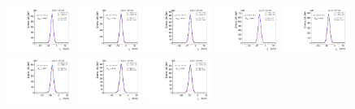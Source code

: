 \begin{figure}[htb]
\includegraphics[width=0.19\textwidth]{plots/Appendix_Recoil_Fits/WmpMC_PF_5TeV_2G/pfu1fit_16.pdf}
\includegraphics[width=0.19\textwidth]{plots/Appendix_Recoil_Fits/WmpMC_PF_5TeV_2G/pfu1fit_17.pdf}
\includegraphics[width=0.19\textwidth]{plots/Appendix_Recoil_Fits/WmpMC_PF_5TeV_2G/pfu1fit_18.pdf}
\includegraphics[width=0.19\textwidth]{plots/Appendix_Recoil_Fits/WmpMC_PF_5TeV_2G/pfu1fit_19.pdf}
\includegraphics[width=0.19\textwidth]{plots/Appendix_Recoil_Fits/WmpMC_PF_5TeV_2G/pfu1fit_20.pdf}
\includegraphics[width=0.19\textwidth]{plots/Appendix_Recoil_Fits/WmpMC_PF_5TeV_2G/pfu1fit_21.pdf}
\includegraphics[width=0.19\textwidth]{plots/Appendix_Recoil_Fits/WmpMC_PF_5TeV_2G/pfu1fit_22.pdf}
\includegraphics[width=0.19\textwidth]{plots/Appendix_Recoil_Fits/WmpMC_PF_5TeV_2G/pfu1fit_23.pdf}

\end{figure}
